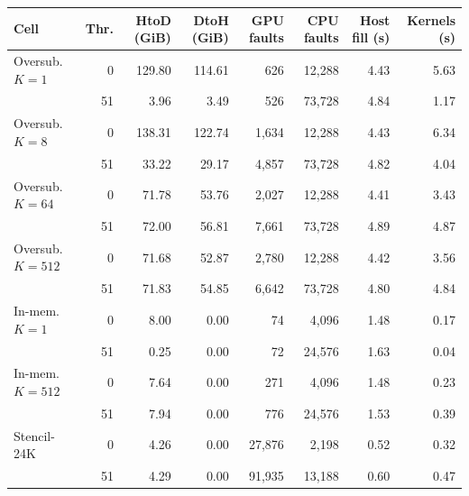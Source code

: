 \begin{tabular}{@{}lrrrrrrr@{}}
\toprule
Cell & Thr. & HtoD (GiB) & DtoH (GiB) & GPU faults & CPU faults & Host fill (s) & Kernels (s) \\
\midrule
Oversub. $K{=}1$ & 0 & 129.80 & 114.61 & 626 & 12{,}288 & 4.43 & 5.63 \\ %
 & 51 & 3.96 & 3.49 & 526 & 73{,}728 & 4.84 & 1.17 \\ %
Oversub. $K{=}8$ & 0 & 138.31 & 122.74 & 1{,}634 & 12{,}288 & 4.43 & 6.34 \\ %
 & 51 & 33.22 & 29.17 & 4{,}857 & 73{,}728 & 4.82 & 4.04 \\ %
Oversub. $K{=}64$ & 0 & 71.78 & 53.76 & 2{,}027 & 12{,}288 & 4.41 & 3.43 \\ %
 & 51 & 72.00 & 56.81 & 7{,}661 & 73{,}728 & 4.89 & 4.87 \\ %
Oversub. $K{=}512$ & 0 & 71.68 & 52.87 & 2{,}780 & 12{,}288 & 4.42 & 3.56 \\ %
 & 51 & 71.83 & 54.85 & 6{,}642 & 73{,}728 & 4.80 & 4.84 \\ %
In-mem. $K{=}1$ & 0 & 8.00 & 0.00 & 74 & 4{,}096 & 1.48 & 0.17 \\ %
 & 51 & 0.25 & 0.00 & 72 & 24{,}576 & 1.63 & 0.04 \\ %
In-mem. $K{=}512$ & 0 & 7.64 & 0.00 & 271 & 4{,}096 & 1.48 & 0.23 \\ %
 & 51 & 7.94 & 0.00 & 776 & 24{,}576 & 1.53 & 0.39 \\ %
Stencil-24K & 0 & 4.26 & 0.00 & 27{,}876 & 2{,}198 & 0.52 & 0.32 \\ %
 & 51 & 4.29 & 0.00 & 91{,}935 & 13{,}188 & 0.60 & 0.47 \\ %
\bottomrule
\end{tabular}
